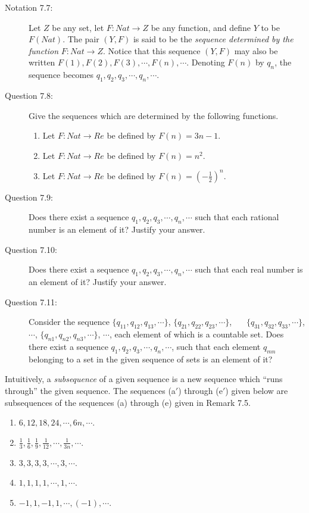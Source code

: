 \documentclass{book}
\begin{document}
\begin{description}
\item[Notation 7.7:] Let $Z$ be any set, let $F: Nat \rightarrow Z$ be any function, and define $Y$ to be $F(Nat)$. The pair $(Y, F)$ is said to be the \emph{sequence determined by the function} $F: Nat \rightarrow Z$. Notice that this sequence $(Y, F)$ may also be written $F(1), F(2), F(3), \cdots, F(n), \cdots$. Denoting $F(n)$ by $q_{n}$, the sequence becomes $q_{1}, q_{2}, q_{3}, \cdots, q_{n}, \cdots$.

\item[Question 7.8:] Give the sequences which are determined by the following functions.
\begin{enumerate}[\hspace{1cm}(a)]
  \item Let $F: Nat \rightarrow Re$ be defined by $F(n) = 3n - 1$.
  \item Let $F: Nat \rightarrow Re$ be defined by $F(n) = n^{2}$.
  \item Let $F: Nat \rightarrow Re$ be defined by $F(n) = (-\frac{1}{2})^{n}$.
\end{enumerate}

\item[Question 7.9:] Does there exist a sequence $q_{1}, q_{2}, q_{3}, \cdots, q_{n}, \cdots$ such that each rational number is an element of it? Justify your answer.

\item[Question 7.10:] Does there exist a sequence $q_{1}, q_{2}, q_{3}, \cdots, q_{n}, \cdots$ such that each real number is an element of it? Justify your answer.

\item[Question 7.11:] Consider the sequence $\{ q_{11}, q_{12}, q_{13}, \cdots \}$, $\{ q_{21}, q_{22}, q_{23}, \cdots \}$, $\ \ \ \ \ $ $\{ q_{31}, q_{32}, q_{33}, \cdots \}$, $\cdots$, $\{ q_{n1}, q_{n2}, q_{n3}, \cdots \}$, $\cdots$, each element of which is a countable set. Does there exist a sequence $q_{1}, q_{2}, q_{3}, \cdots, q_{n}, \cdots$, such that each element $q_{mn}$ belonging to a set in the given sequence of sets is an element of it?

\end{description}

Intuitively, a \emph{subsequence} of a given sequence is a new sequence which ``runs through'' the given sequence. The sequences (a$'$) through (e$'$) given below are subsequences of the sequences (a) through (e) given in Remark 7.5.
\begin{enumerate}[\hspace{1cm}(a$'$)]
  \item $6, 12, 18, 24, \cdots, 6n, \cdots$.
  \item $\frac{1}{3}, \frac{1}{6}, \frac{1}{9}, \frac{1}{12}, \cdots, \frac{1}{3n}, \cdots$.
  \item $3, 3, 3, 3, \cdots, 3, \cdots$.
  \item $1, 1, 1, 1, \cdots, 1, \cdots$.
  \item $-1, 1, -1, 1, \cdots, (-1), \cdots$.
\end{enumerate}
\end{document}
